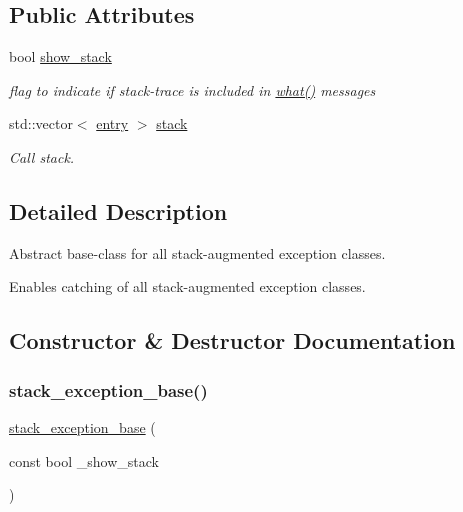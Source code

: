 \subsection*{Public Attributes}
\begin{DoxyCompactItemize}
\item 
bool \mbox{\hyperlink{classstacktrace_1_1stack__exception__base_a328e39311a54853f3f733b0a5be56a2a}{show\+\_\+stack}}
\begin{DoxyCompactList}\small\item\em flag to indicate if stack-\/trace is included in \mbox{\hyperlink{classstacktrace_1_1stack__exception__base_a926844cae0786e6c6192f557a12e39f0}{what()}} messages \end{DoxyCompactList}\item 
std\+::vector$<$ \mbox{\hyperlink{structstacktrace_1_1entry}{entry}} $>$ \mbox{\hyperlink{classstacktrace_1_1call__stack_a2a3ab0b5bb69cd4a275f3f344d3cc6cd}{stack}}
\begin{DoxyCompactList}\small\item\em Call stack. \end{DoxyCompactList}\end{DoxyCompactItemize}


\subsection{Detailed Description}
Abstract base-\/class for all stack-\/augmented exception classes. 

Enables catching of all stack-\/augmented exception classes. 

\subsection{Constructor \& Destructor Documentation}
\mbox{\label{classstacktrace_1_1stack__exception__base_a76c136190eebc9baa852d2f1a7b12914}} 
\subsubsection{\texorpdfstring{stack\+\_\+exception\+\_\+base()}{stack\_exception\_base()}}
{\footnotesize\ttfamily \mbox{\hyperlink{classstacktrace_1_1stack__exception__base}{stack\+\_\+exception\+\_\+base}} (\begin{DoxyParamCaption}\item[{const bool}]{\+\_\+show\+\_\+stack }\end{DoxyParamCaption})\hspace{0.3cm}{\ttfamily [inline]}}

